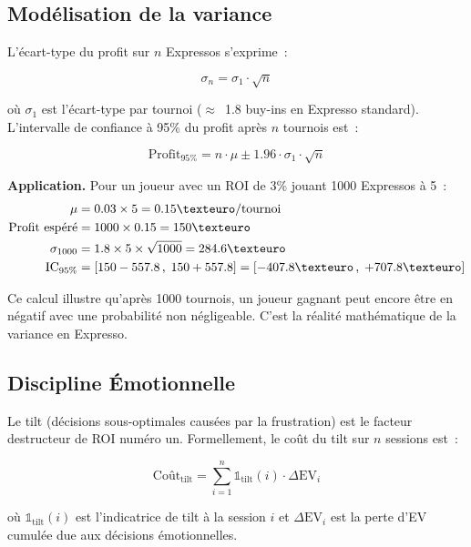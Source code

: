 \documentclass[a4paper,11pt]{article}
\newcommand{\EV}{\mathrm{EV}}
\begin{document}
\subsection{Mod\'elisation de la variance}

L'\'ecart-type du profit sur $n$ Expressos s'exprime~:

\begin{equation}
\sigma_n = \sigma_1 \cdot \sqrt{n}
\end{equation}

o\`u $\sigma_1$ est l'\'ecart-type par tournoi ($\approx$~1.8 buy-ins en Expresso standard). L'intervalle de confiance \`a 95\% du profit apr\`es $n$ tournois est~:

\begin{equation}
\text{Profit}_{95\%} = n \cdot \mu \pm 1.96 \cdot \sigma_1 \cdot \sqrt{n}
\end{equation}

\textbf{Application.} Pour un joueur avec un ROI de 3\% jouant 1000 Expressos \`a 5\texteuro~:
\begin{align}
\mu &= 0.03 \times 5 = 0.15\texteuro/\text{tournoi} \\
\text{Profit esp\'er\'e} &= 1000 \times 0.15 = 150\texteuro \\
\sigma_{1000} &= 1.8 \times 5 \times \sqrt{1000} = 284.6\texteuro \\
\text{IC}_{95\%} &= [150 - 557.8\,,\; 150 + 557.8] = [-407.8\texteuro\,,\; +707.8\texteuro]
\end{align}

Ce calcul illustre qu'apr\`es 1000 tournois, un joueur gagnant peut encore \^etre en n\'egatif avec une probabilit\'e non n\'egligeable. C'est la r\'ealit\'e math\'ematique de la variance en Expresso.

\subsection{Discipline \'Emotionnelle}

Le tilt (d\'ecisions sous-optimales caus\'ees par la frustration) est le facteur destructeur de ROI num\'ero un. Formellement, le co\^ut du tilt sur $n$ sessions est~:

\begin{equation}
\text{Co\^ut}_{\text{tilt}} = \sum_{i=1}^{n} \mathbb{1}_{\text{tilt}}(i) \cdot \Delta\EV_i
\end{equation}

o\`u $\mathbb{1}_{\text{tilt}}(i)$ est l'indicatrice de tilt \`a la session $i$ et $\Delta\EV_i$ est la perte d'EV cumul\'ee due aux d\'ecisions \'emotionnelles.
\end{document}

